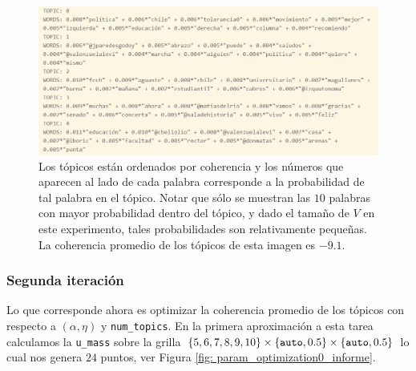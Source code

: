 \documentclass{article}
\begin{document}
	\begin{figure}[H]
		\centering
		\includegraphics[scale=.32]{../imgs/boric0_informe.png}
		\caption{Los tópicos están ordenados por coherencia y los números que aparecen al lado de cada palabra corresponde a la probabilidad de tal palabra en el tópico. Notar que sólo se muestran las $10$ palabras con mayor probabilidad dentro del tópico, y dado el tamaño de $V$ en este experimento, tales probabilidades son relativamente pequeñas. La coherencia promedio de los tópicos de esta imagen es $-9.1$.}
		\label{fig: boric0_informe}
	\end{figure}

\subsubsection{Segunda iteración}
	Lo que corresponde ahora es optimizar la coherencia promedio de los tópicos con respecto a $(\alpha, \eta)$ y \texttt{num\_topics}. En la primera aproximación a esta tarea calculamos la \texttt{u\_mass} sobre la grilla $\left\{5,6,7,8,9,10\right\}\times\left\{\texttt{auto}, 0.5\right\}\times\left\{\texttt{auto}, 0.5\right\}$ lo cual nos genera $24$ puntos, ver Figura \ref{fig: param_optimization0_informe}.
	
	
	
\end{document}
